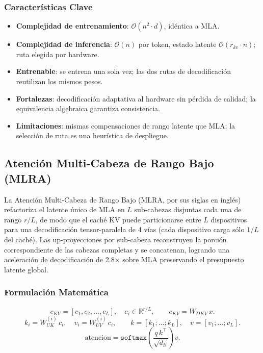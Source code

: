 \subsubsection{Características Clave}
\begin{itemize}[leftmargin=*]
    \item \textbf{Complejidad de entrenamiento}: $\mathcal{O}(n^2 \cdot d)$, idéntica a MLA.
    \item \textbf{Complejidad de inferencia}: $\mathcal{O}(n)$ por token, estado latente $\mathcal{O}(r_{kv} \cdot n)$; ruta elegida por hardware.
    \item \textbf{Entrenable}: se entrena una sola vez; las dos rutas de decodificación reutilizan los mismos pesos.
    \item \textbf{Fortalezas}: decodificación adaptativa al hardware sin pérdida de calidad; la equivalencia algebraica garantiza consistencia.
    \item \textbf{Limitaciones}: mismas compensaciones de rango latente que MLA; la selección de ruta es una heurística de despliegue.
\end{itemize}

\subsection{Atención Multi-Cabeza de Rango Bajo (MLRA)}
La Atención Multi-Cabeza de Rango Bajo (MLRA, por sus siglas en inglés) \citep{liu_mlra_2026} refactoriza el latente único de MLA en $L$ sub-cabezas disjuntas cada una de rango $r/L$, de modo que el caché KV puede particionarse entre $L$ dispositivos para una decodificación tensor-paralela de 4 vías (cada dispositivo carga sólo $1/L$ del caché). Las up-proyecciones por sub-cabeza reconstruyen la porción correspondiente de las cabezas completas y se concatenan, logrando una aceleración de decodificación de 2.8$\times$ sobre MLA preservando el presupuesto latente global.

\subsubsection{Formulación Matemática}
\[
c_{KV} = [c_1, c_2, \ldots, c_L], \quad c_i \in \mathbb{R}^{r/L}, \qquad c_{KV} = W_{DKV}\, x.
\]
\[
k_i = W_{UK}^{(i)}\, c_i, \quad v_i = W_{UV}^{(i)}\, c_i, \qquad
k = [k_1; \ldots; k_L], \quad v = [v_1; \ldots; v_L].
\]
\[
\text{atencion} = \texttt{softmax}\!\left(\frac{q\, k^\top}{\sqrt{d_h}}\right) v.
\]

